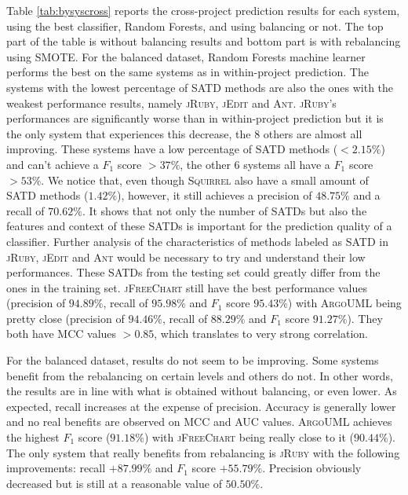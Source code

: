 Table \ref{tab:bysyscross} reports the cross-project prediction results for each system, using the best classifier, Random Forests, and using balancing or not. The top part of the table is without balancing results and bottom part is with rebalancing using SMOTE. For the balanced dataset, Random Forests machine learner performs the best on the same systems as in within-project prediction. The systems with the lowest percentage of SATD methods are also the ones with the weakest performance results, namely \textsc{jRuby}, \textsc{jEdit} and \textsc{Ant}. \textsc{jRuby}'s performances are significantly worse than in within-project prediction but it is the only system that experiences this decrease, the 8 others are almost all improving. These systems have a low percentage of SATD methods ($<2.15\%$) and can't achieve a $F_1$ score $>37\%$, the other 6 systems all have a $F_1$ score $>53\%$. We notice that, even though \textsc{Squirrel} also have a small amount of SATD methods ($1.42\%$), however, it still achieves a precision of $48.75\%$ and a recall of $70.62\%$. It shows that not only the number of SATDs but also the features and context of these SATDs is important for the prediction quality of a classifier. Further analysis of the characteristics of methods labeled as SATD in \textsc{jRuby, jEdit} and \textsc{Ant} would be necessary to try and understand their low performances. These SATDs from the testing set could greatly differ from the ones in the training set. \textsc{jFreeChart} still have the best performance values (precision of $94.89\%$, recall of $95.98\%$ and $F_1$ score $95.43\%$) with \textsc{ArgoUML} being pretty close (precision of $94.46\%$, recall of $88.29\%$ and $F_1$ score $91.27\%$). They both have MCC values $>0.85$, which translates to very strong correlation.

For the balanced dataset, results do not seem to be improving. Some systems benefit from the rebalancing on certain levels and others do not. In other words, the results are in line with what is obtained without balancing, or even lower. As expected, recall increases at the expense of precision. Accuracy is generally lower and no real benefits are observed on MCC and AUC values. \textsc{ArgoUML} achieves the highest $F_1$ score ($91.18\%$) with \textsc{jFreeChart} being really close to it ($90.44\%$). The only system that really benefits from rebalancing is \textsc{jRuby} with the following improvements: recall $+87.99\%$ and $F_1$ score $+55.79\%$. Precision obviously decreased but is still at a reasonable value of $50.50\%$. 

